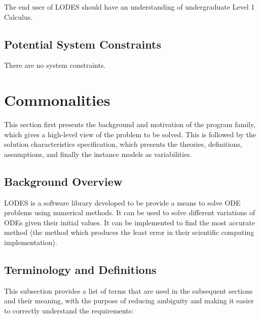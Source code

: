 \documentclass[12pt]{article}
\newcommand{\progname}{LODES} %
\begin{document}
The end user of \progname{} should have an understanding of undergraduate Level
1 Calculus.

\subsection{Potential System Constraints}

There are no system constraints.

\section{Commonalities}

This section first presents the background and motivation of the program family, which gives a high-level
view of the problem to be solved.  This is followed by the solution characteristics
specification, which presents the theories, definitions, assumptions, and finally
the instance models as variabilities.

\subsection{Background Overview} \label{Sec_bo}

\progname{} is a software library developed to be provide a means to solve ODE problems
using numerical methods. It can be used to solve different variations of ODEs given their initial values.
It can be implemented to find the most accurate method (the method which produces the least error in their
scientific computing implementation).

\subsection{Terminology and Definitions}

This subsection provides a list of terms that are used in the subsequent
sections and their meaning, with the purpose of reducing ambiguity and making it
easier to correctly understand the requirements:
\end{document}
